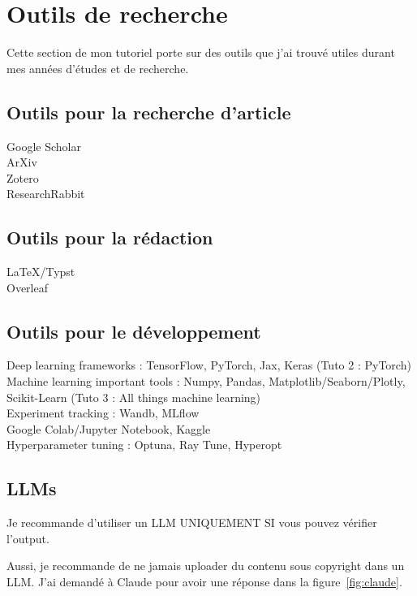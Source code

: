 \documentclass{book}
\begin{document}
\setlength{\parindent}{0cm}
\setcounter{chapter}{1}
\chapter{Outils de recherche}

Cette section de mon tutoriel porte sur des outils que j'ai trouvé utiles durant mes années d'études et de recherche. 


\section{Outils pour la recherche d'article}

Google Scholar \\
ArXiv \\
Zotero \\
ResearchRabbit

\section{Outils pour la rédaction}
LaTeX/Typst \\
Overleaf

\section{Outils pour le développement}
Deep learning frameworks : TensorFlow, PyTorch, Jax, Keras (Tuto 2 : PyTorch)\\
Machine learning important tools : Numpy, Pandas, Matplotlib/Seaborn/Plotly, Scikit-Learn (Tuto 3 : All things machine learning)\\
Experiment tracking : Wandb, MLflow \\
Google Colab/Jupyter Notebook, Kaggle \\
Hyperparameter tuning : Optuna, Ray Tune, Hyperopt

\section{LLMs}

Je recommande d’utiliser un LLM UNIQUEMENT SI vous pouvez vérifier l’output. 

Aussi, je recommande de ne jamais uploader du contenu sous copyright dans un LLM. J'ai demandé à Claude pour avoir une réponse dans la figure~\ref{fig:claude}.
\end{document}
